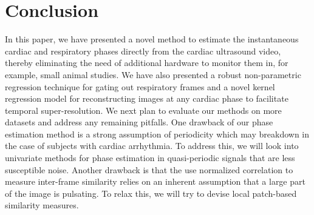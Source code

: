 \documentclass[runningheads,a4paper]{llncs}
\begin{document}
\section{Conclusion}
\label{sec:conclusion}
\vspace{-0.3cm}
%
In this paper, we have presented a novel method to estimate the instantaneous cardiac and respiratory phases directly from the cardiac ultrasound video, thereby eliminating the need of additional hardware to monitor them in, for example, small animal studies. We have also presented a robust non-parametric regression technique for gating out respiratory frames and a novel kernel regression model for reconstructing images at any cardiac phase to facilitate temporal super-resolution. We next plan to evaluate our methods on more datasets and address any remaining pitfalls. One drawback of our phase estimation method is a strong assumption of periodicity which may breakdown in the case of subjects with cardiac arrhythmia. To address this, we will look into univariate methods for phase estimation in quasi-periodic signals that are less susceptible noise. Another drawback is that the use normalized correlation to measure inter-frame similarity relies on an inherent assumption that a large part of the image is pulsating. To relax this, we will try to devise local patch-based similarity measures. 
%
\vspace{-0.5cm}
%


\end{document}
